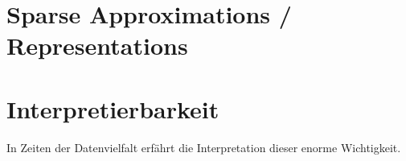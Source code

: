 \section{Sparse Approximations / Representations}

\section{Interpretierbarkeit}

In Zeiten der Datenvielfalt erfährt die Interpretation dieser enorme Wichtigkeit.